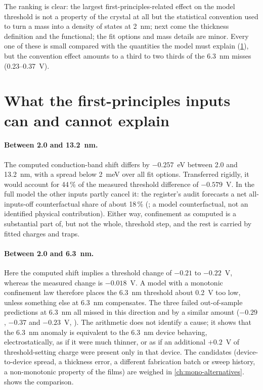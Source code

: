 The ranking is clear: the largest first-principles-related effect on the model threshold is not a property of the
crystal at all but the statistical convention used to turn a mass into a density of states at 2~nm; next come the
thickness definition and the functional; the fit options and mass details are minor. Every one of these is small
compared with the quantities the model must explain (\cref{sec:mono-ms-explain}), but the convention effect
amounts to a third to two thirds of the 6.3~nm misses (0.23--0.37~V).

\section{What the first-principles inputs can and cannot explain}
\label{sec:mono-ms-explain}

\paragraph{Between 2.0 and 13.2~nm.} The computed conduction-band shift differs by $-0.257$~eV between 2.0 and 13.2~nm,
with a spread below 2~meV over all fit options. Transferred rigidly, it would account for 44\,\% of the measured
threshold difference of $-0.579$~V. In the full model the other inputs partly cancel it: the register's audit forecasts
a net all-inputs-off counterfactual share of about 18\,\% (; a model counterfactual, not an identified
physical contribution). Either way, confinement as computed is a substantial part of, but not the whole, threshold step,
and the rest is carried by fitted charges and traps.

\paragraph{Between 2.0 and 6.3~nm.} Here the computed shift implies a threshold change of $-0.21$ to $-0.22$~V, whereas
the measured change is $-0.018$~V. A model with a monotonic confinement law therefore places the 6.3~nm threshold about
0.2~V too low, unless something else at 6.3~nm compensates. The three failed out-of-sample predictions at 6.3~nm all
missed in this direction and by a similar amount ($-0.29$, $-0.37$ and $-0.23$~V, ). The arithmetic does not
identify a cause; it shows that the 6.3~nm anomaly is equivalent to the 6.3~nm device behaving, electrostatically, as if
it were much thinner, or as if an additional $+0.2$~V of threshold-setting charge were present only in that device. The
candidates (device-to-device spread, a thickness error, a different fabrication batch or sweep history, a non-monotonic
property of the films) are weighed in \cref{ch:mono-alternatives}.  shows the
comparison.

